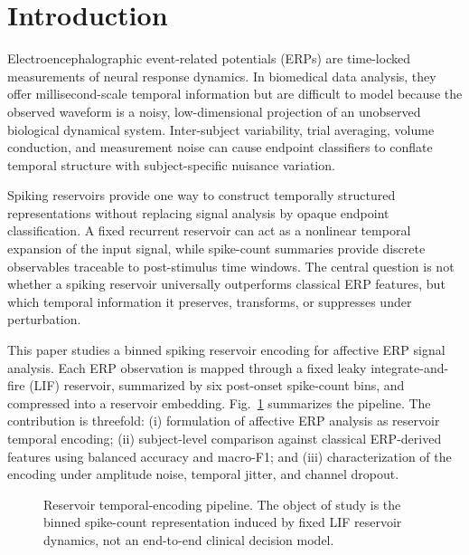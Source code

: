 \section{Introduction}
Electroencephalographic event-related potentials (ERPs) are time-locked measurements of neural response dynamics. In biomedical data analysis, they offer millisecond-scale temporal information but are difficult to model because the observed waveform is a noisy, low-dimensional projection of an unobserved biological dynamical system. Inter-subject variability, trial averaging, volume conduction, and measurement noise can cause endpoint classifiers to conflate temporal structure with subject-specific nuisance variation.

Spiking reservoirs provide one way to construct temporally structured representations without replacing signal analysis by opaque endpoint classification. A fixed recurrent reservoir can act as a nonlinear temporal expansion of the input signal, while spike-count summaries provide discrete observables traceable to post-stimulus time windows. The central question is not whether a spiking reservoir universally outperforms classical ERP features, but which temporal information it preserves, transforms, or suppresses under perturbation.

This paper studies a binned spiking reservoir encoding for affective ERP signal analysis. Each ERP observation is mapped through a fixed leaky integrate-and-fire (LIF) reservoir, summarized by six post-onset spike-count bins, and compressed into a reservoir embedding. Fig.~\ref{fig:pipeline} summarizes the pipeline. The contribution is threefold: (i) formulation of affective ERP analysis as reservoir temporal encoding; (ii) subject-level comparison against classical ERP-derived features using balanced accuracy and macro-F1; and (iii) characterization of the encoding under amplitude noise, temporal jitter, and channel dropout.

\begin{figure}[t]
\centering
\resizebox{\linewidth}{!}{}
\caption{Reservoir temporal-encoding pipeline. The object of study is the binned spike-count representation induced by fixed LIF reservoir dynamics, not an end-to-end clinical decision model.}
\label{fig:pipeline}
\end{figure}
